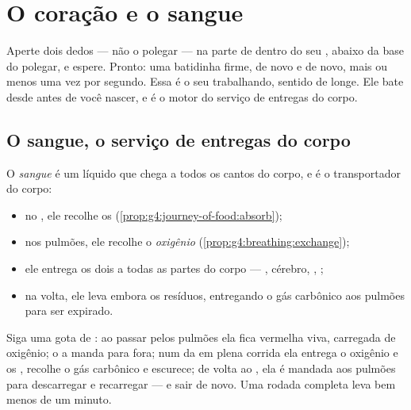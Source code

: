 \chapter{O coração e o sangue}\label{ch:g4:heart-and-blood}

Aperte dois dedos --- não o polegar --- na parte de dentro do seu
, abaixo da base do polegar, e espere. Pronto: uma batidinha
firme, de novo e de novo, mais ou menos uma vez por segundo. Essa
 é o seu  trabalhando, sentido de longe. Ele bate desde
antes de você nascer, e é o motor do serviço de entregas do corpo.

\section{O sangue, o serviço de entregas do corpo}

\begin{proposition}\label{prop:g4:heart-and-blood:carries}
O \emph{sangue} é um líquido que chega a todos os
cantos do corpo, e é o transportador do corpo:
\begin{itemize}
  \item no , ele recolhe os \emph{}
        (\cref{prop:g4:journey-of-food:absorb});
  \item nos pulmões, ele recolhe o \emph{oxigênio}
        (\cref{prop:g4:breathing:exchange});
  \item ele entrega os dois a todas as partes do corpo --- ,
        cérebro, , ;
  \item na volta, ele leva embora os resíduos, entregando o gás
        carbônico aos pulmões para ser expirado.
\end{itemize}
\end{proposition}
\admitted

\begin{example}\label{ex:g4:heart-and-blood:round}
Siga uma gota de : ao passar pelos pulmões ela fica vermelha
viva, carregada de oxigênio; o  a manda para fora; num
 da  em plena corrida ela entrega o oxigênio e os
, recolhe o gás carbônico e escurece; de volta ao ,
ela é mandada aos pulmões para descarregar e recarregar --- e sair
de novo. Uma rodada completa leva bem menos de um minuto.
\end{example}

